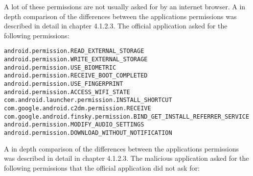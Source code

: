 A lot of these permissions are not usually asked for by an internet browser. A in depth comparison of the differences between the applications permissions was described in detail in chapter 4.1.2.3.
\newpage
{}
The official application asked for the following permissions:

\texttt{android.permission.READ\_EXTERNAL\_STORAGE }
\newline \texttt{android.permission.WRITE\_EXTERNAL\_STORAGE }
\newline \texttt{android.permission.USE\_BIOMETRIC }
\newline \texttt{android.permission.RECEIVE\_BOOT\_COMPLETED}
\newline \texttt{android.permission.USE\_FINGERPRINT }
\newline \texttt{android.permission.ACCESS\_WIFI\_STATE}
\newline \texttt{com.android.launcher.permission.INSTALL\_SHORTCUT }
\newline \texttt{com.google.android.c2dm.permission.RECEIVE}
\newline \texttt{com.google.android.finsky.permission.BIND\_GET\_INSTALL\_REFERRER\_SERVICE}
\newline \texttt{android.permission.MODIFY\_AUDIO\_SETTINGS }
\newline \texttt{android.permission.DOWNLOAD\_WITHOUT\_NOTIFICATION}

A in depth comparison of the differences between the applications permissions was described in detail in chapter 4.1.2.3.
\newpage
{}
The malicious application asked for the following permissions that the official application did not ask for:

